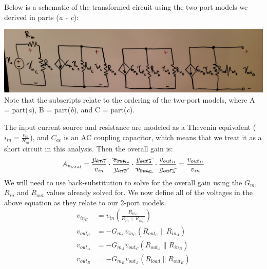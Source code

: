 \documentclass[12pt, fleqn]{article}
\begin{document}
\begin{enumerate}[label=(\alph*)]
{    Below is a schematic of the transformed circuit using the two-port models we derived in parts (\textit{a - c}):
    
    \includegraphics[scale=0.125, center]{p2d.jpg}\\
    
    Note that the subscripts relate to the ordering of the two-port models, where A = part(\textit{a}), B = part(\textit{b}), and C = part(\textit{c}).
    
    \newpage\noindent
    The input current source and resistance are modeled as a Thevenin equivalent ($i_{in} = \frac{v_{in}}{R_{in}}$), and $C_{ac}$ is an AC coupling capacitor, which means that we treat it as a short circuit in this analysis.  Then the overall gain is:
    \begin{equation}
        A_{v_{total}} = \frac{\cancel{v_{{in}_C}}}{v_{in}} \cdot \frac{\bcancel{v_{{out}_C}}}{\cancel{v_{{in}_C}}} \cdot \frac{\cancel{v_{{out}_A}}}{\bcancel{v_{{out}_C}}} \cdot \frac{v_{{out}_B}}{\cancel{v_{{out}_A}}}
        = \frac{v_{{out}_B}}{v_{in}}
    \end{equation}
    We will need to use back-substitution to solve for the overall gain using the $G_m$, $R_{in}$ and $R_{out}$ values already solved for.  We now define all of the voltages in the above equation as they relate to our 2-port models.
    \begin{align*}
        v_{{in}_C} &= v_{in} \left(\frac{R_{{in}_C}}{R_{in} + R_{{in}_C}}\right)\\[0.25cm]
        v_{{out}_C} &= -G_{m_C} v_{{in}_C}(R_{{out}_C} \parallel R_{{in}_A})\\[0.25cm]
        v_{{out}_A} &= -G_{m_A} v_{{out}_C}(R_{{out}_A} \parallel R_{{in}_B})\\[0.25cm]
        v_{{out}_B} &= -G_{m_B} v_{{out}_A}(R_{load} \parallel R_{{out}_B})
    \end{align*}
    
}
\end{enumerate}
\end{document}

